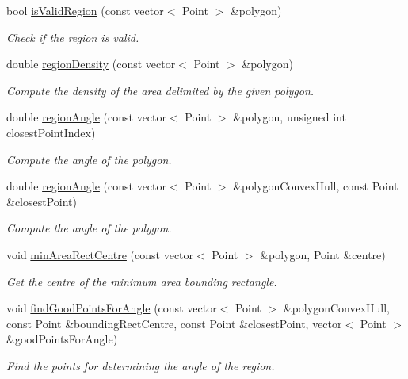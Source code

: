 \begin{DoxyCompactItemize}
bool \hyperlink{classmultiscale_1_1analysis_1_1RegionDetector_a2be058ae797d80787725ae2c246ba256}{is\-Valid\-Region} (const vector$<$ Point $>$ \&polygon)
\begin{DoxyCompactList}\small\item\em Check if the region is valid. \end{DoxyCompactList}\item 
double \hyperlink{classmultiscale_1_1analysis_1_1RegionDetector_a6beb6b2ecaccd60130bcf8dd808750b8}{region\-Density} (const vector$<$ Point $>$ \&polygon)
\begin{DoxyCompactList}\small\item\em Compute the density of the area delimited by the given polygon. \end{DoxyCompactList}\item 
double \hyperlink{classmultiscale_1_1analysis_1_1RegionDetector_ac016631bd35bf0dd2d7e941076ec09c8}{region\-Angle} (const vector$<$ Point $>$ \&polygon, unsigned int closest\-Point\-Index)
\begin{DoxyCompactList}\small\item\em Compute the angle of the polygon. \end{DoxyCompactList}\item 
double \hyperlink{classmultiscale_1_1analysis_1_1RegionDetector_afb2aa3926a1bdc868f990db65df1ed4c}{region\-Angle} (const vector$<$ Point $>$ \&polygon\-Convex\-Hull, const Point \&closest\-Point)
\begin{DoxyCompactList}\small\item\em Compute the angle of the polygon. \end{DoxyCompactList}\item 
void \hyperlink{classmultiscale_1_1analysis_1_1RegionDetector_a53457e7405a2a4558fe659aa66931834}{min\-Area\-Rect\-Centre} (const vector$<$ Point $>$ \&polygon, Point \&centre)
\begin{DoxyCompactList}\small\item\em Get the centre of the minimum area bounding rectangle. \end{DoxyCompactList}\item 
void \hyperlink{classmultiscale_1_1analysis_1_1RegionDetector_a3b76437c936dc9055c3ae49846f4016a}{find\-Good\-Points\-For\-Angle} (const vector$<$ Point $>$ \&polygon\-Convex\-Hull, const Point \&bounding\-Rect\-Centre, const Point \&closest\-Point, vector$<$ Point $>$ \&good\-Points\-For\-Angle)
\begin{DoxyCompactList}\small\item\em Find the points for determining the angle of the region. \end{DoxyCompactList}\item 

\end{DoxyCompactItemize}
